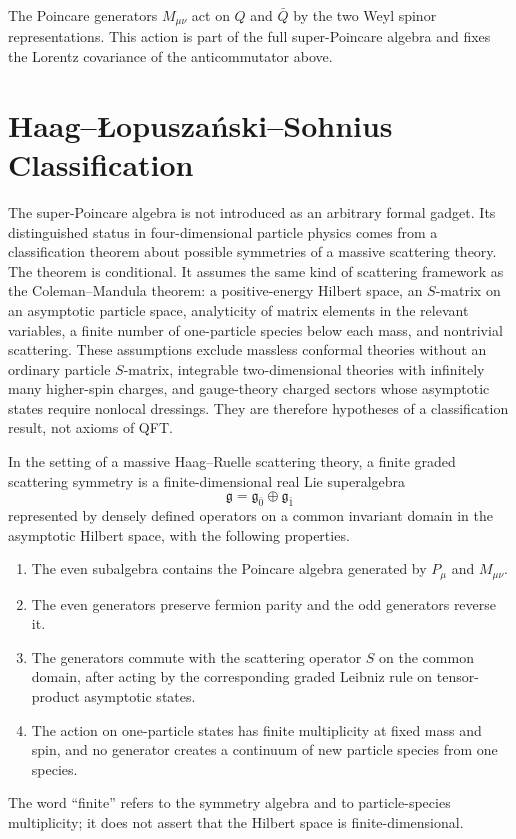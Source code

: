 The Poincare generators \(M_{\mu\nu}\) act on \(Q\) and \(\bar Q\) by the two
Weyl spinor representations.  This action is part of the full super-Poincare
algebra and fixes the Lorentz covariance of the anticommutator above.

\section{Haag--\L opusza\'nski--Sohnius Classification}

The super-Poincare algebra is not introduced as an arbitrary formal gadget.
Its distinguished status in four-dimensional particle physics comes from a
classification theorem about possible symmetries of a massive scattering
theory.  The theorem is conditional.  It assumes the same kind of scattering
framework as the Coleman--Mandula theorem: a positive-energy Hilbert space,
an \(S\)-matrix on an asymptotic particle space, analyticity of matrix
elements in the relevant variables, a finite number of one-particle species
below each mass, and nontrivial scattering.  These assumptions exclude
massless conformal theories without an ordinary particle \(S\)-matrix,
integrable two-dimensional theories with infinitely many higher-spin charges,
and gauge-theory charged sectors whose asymptotic states require nonlocal
dressings.  They are therefore hypotheses of a classification result, not
axioms of QFT.

\begin{definition}
\label{def:finite-graded-scattering-symmetry}
In the setting of a massive Haag--Ruelle scattering theory, a finite graded
scattering symmetry is a finite-dimensional real Lie superalgebra
\[
  \mathfrak g=\mathfrak g_{\bar 0}\oplus \mathfrak g_{\bar 1}
\]
represented by densely defined operators on a common invariant domain in the
asymptotic Hilbert space, with the following properties.
\begin{enumerate}
  \item The even subalgebra contains the Poincare algebra generated by
  \(P_\mu\) and \(M_{\mu\nu}\).
  \item The even generators preserve fermion parity and the odd generators
  reverse it.
  \item The generators commute with the scattering operator \(S\) on the
  common domain, after acting by the corresponding graded Leibniz rule on
  tensor-product asymptotic states.
  \item The action on one-particle states has finite multiplicity at fixed
  mass and spin, and no generator creates a continuum of new particle species
  from one species.
\end{enumerate}
The word ``finite'' refers to the symmetry algebra and to particle-species
multiplicity; it does not assert that the Hilbert space is finite-dimensional.
\end{definition}

